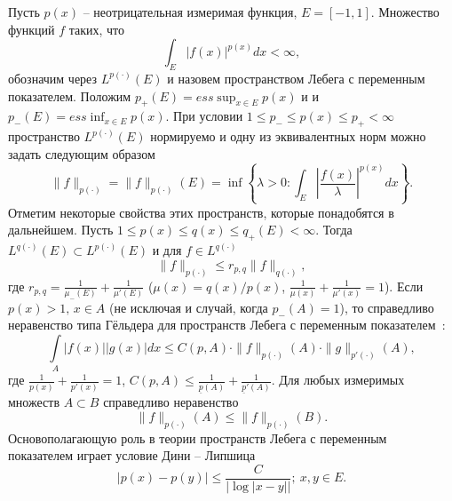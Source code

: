 Пусть $p(x)$ -- неотрицательная измеримая функция, $E=[-1,1]$. Множество функций $f$ таких, что
\begin{equation}\label{s2-lpx-def-1}
  \int_{E}|f(x)|^{p(x)}dx<\infty,
\end{equation}
обозначим через $L^{p(\cdot)}(E)$ и назовем пространством Лебега с переменным показателем. Положим $p_+(E)=ess\sup_{x\in E} p(x)$ и и $p_-(E)=ess\inf_{x\in E} p(x)$. При условии $1\le p_-\le p(x)\le p_+<\infty$ пространство $L^{p(\cdot)}(E)$ нормируемо \cite{tad-lpxtopology} и одну из эквивалентных норм можно задать следующим образом
\begin{equation}\label{s2-lpx-norm}
  \|f\|_{p(\cdot)}=\|f\|_{p(\cdot)}(E)=\inf\left\{\lambda>0:\int_{E}\left|\frac{f(x)}\lambda\right|^{p(x)}dx\right\}.
\end{equation}
Отметим некоторые свойства этих пространств, которые понадобятся в дальнейшем. Пусть $1\le p(x)\le q(x)\le q_+(E)<\infty$. Тогда \cite{tad-SHII-Haar} $L^{q(\cdot)}(E)\subset L^{p(\cdot)}(E)$ и для $f\in L^{q(\cdot)}$
\begin{equation}\label{LpxLqxNormIneq}
  \|f\|_{p(\cdot)}\le r_{p,q}\|f\|_{q(\cdot)},
\end{equation}
где $r_{p,q}=\frac1{\mu_-(E)}+\frac1{\mu'(E)}$ ($\mu(x)=q(x)/p(x)$, $\frac1{\mu(x)}+\frac1{\mu'(x)}=1$).
Если $p(x)>1,\, x \in A$ (не исключая и случай, когда $p_-(A)=1$), то справедливо неравенство типа Гёльдера для пространств Лебега с переменным показателем~\cite[нер-во (8)]{tad-lpxtopology}:
\begin{equation}\label{LpxHoelderIneq}
  \int\limits_A |f(x)||g(x)|dx \le
  C(p,A) \cdot \|f\|_{p(\cdot)}(A) \cdot \|g\|_{p'(\cdot)}(A),
\end{equation}
где $\frac{1}{p(x)}+\frac{1}{p'(x)}=1$, $C(p,A)\le \frac{1}{\underline{p}(A)}+\frac{1}{\underline{p}'(A)}$.
Для любых измеримых множеств $A\subset B$ справедливо неравенство
\begin{equation}\label{LpxNormSubsetIneq}
  \|f\|_{p(\cdot)}(A) \le \|f\|_{p(\cdot)}(B).
\end{equation}
Основополагающую роль в теории пространств Лебега с переменным показателем играет условие Дини -- Липшица
\begin{equation}\label{DiniLipCond}
	|p(x)-p(y)| \le \frac{C}{|\log |x-y||};\ x,y \in E.
\end{equation}



